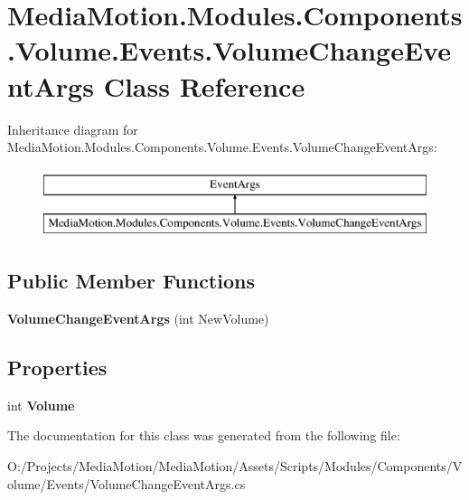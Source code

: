 \hypertarget{class_media_motion_1_1_modules_1_1_components_1_1_volume_1_1_events_1_1_volume_change_event_args}{\section{Media\+Motion.\+Modules.\+Components.\+Volume.\+Events.\+Volume\+Change\+Event\+Args Class Reference}
\label{class_media_motion_1_1_modules_1_1_components_1_1_volume_1_1_events_1_1_volume_change_event_args}
}
Inheritance diagram for Media\+Motion.\+Modules.\+Components.\+Volume.\+Events.\+Volume\+Change\+Event\+Args\+:\begin{figure}[H]
\begin{center}
\leavevmode
\includegraphics[height=2.000000cm]{class_media_motion_1_1_modules_1_1_components_1_1_volume_1_1_events_1_1_volume_change_event_args}
\end{center}
\end{figure}
\subsection*{Public Member Functions}
\begin{DoxyCompactItemize}
\item 
\hypertarget{class_media_motion_1_1_modules_1_1_components_1_1_volume_1_1_events_1_1_volume_change_event_args_a4a9db792753615ff8082da56203cdaf4}{{\bfseries Volume\+Change\+Event\+Args} (int New\+Volume)}\label{class_media_motion_1_1_modules_1_1_components_1_1_volume_1_1_events_1_1_volume_change_event_args_a4a9db792753615ff8082da56203cdaf4}

\end{DoxyCompactItemize}
\subsection*{Properties}
\begin{DoxyCompactItemize}
\item 
\hypertarget{class_media_motion_1_1_modules_1_1_components_1_1_volume_1_1_events_1_1_volume_change_event_args_abaa32dffd46ba9d89087da5bb65d3adc}{int {\bfseries Volume}}\label{class_media_motion_1_1_modules_1_1_components_1_1_volume_1_1_events_1_1_volume_change_event_args_abaa32dffd46ba9d89087da5bb65d3adc}

\end{DoxyCompactItemize}


The documentation for this class was generated from the following file\+:\begin{DoxyCompactItemize}
\item 
O\+:/\+Projects/\+Media\+Motion/\+Media\+Motion/\+Assets/\+Scripts/\+Modules/\+Components/\+Volume/\+Events/Volume\+Change\+Event\+Args.\+cs\end{DoxyCompactItemize}
